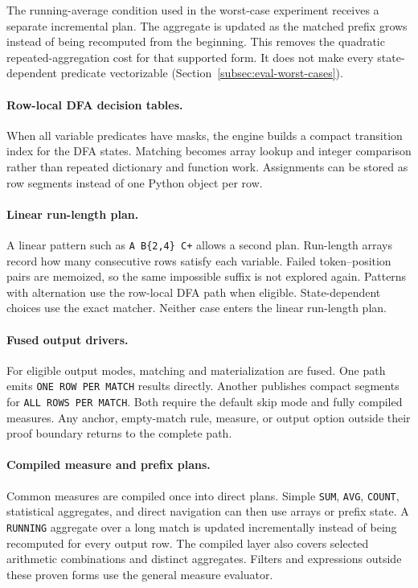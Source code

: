 The running-average condition used in the worst-case experiment
receives a separate
incremental plan.  The aggregate is updated as the matched prefix grows
instead of being recomputed from the beginning.  This removes the
quadratic repeated-aggregation cost for that supported form.  It does
not make every state-dependent predicate vectorizable
(Section~\ref{subsec:eval-worst-cases}).

\paragraph{Row-local DFA decision tables.}
When all variable predicates have masks, the engine builds a compact
transition index for the DFA states.  Matching becomes array lookup and
integer comparison rather than repeated dictionary and function work.
Assignments can be stored as row segments instead of one Python object
per row.

\paragraph{Linear run-length plan.}
A linear pattern such as \texttt{A B\{2,4\} C+} allows a second plan.
Run-length arrays record how many consecutive rows satisfy each
variable.  Failed token--position pairs are memoized, so the same
impossible suffix is not explored again.  Patterns with alternation use
the row-local DFA path when eligible.  State-dependent choices use the
exact matcher.  Neither case enters the linear run-length plan.

\paragraph{Fused output drivers.}
For eligible output modes, matching and materialization are fused.
One path emits \texttt{ONE ROW PER MATCH} results directly.  Another
publishes compact segments for \texttt{ALL ROWS PER MATCH}.  Both
require the default skip mode and fully compiled measures.  Any anchor,
empty-match rule, measure, or output option outside their proof
boundary returns to the complete path.

\paragraph{Compiled measure and prefix plans.}
Common measures are compiled once into direct plans.  Simple
\texttt{SUM}, \texttt{AVG}, \texttt{COUNT}, statistical aggregates,
and direct navigation can then use arrays or prefix state.  A
\texttt{RUNNING} aggregate over a long match is updated incrementally
instead of being recomputed for every output row.  The compiled layer
also covers selected arithmetic combinations and distinct aggregates.
Filters and expressions outside these proven forms use the general
measure evaluator.

